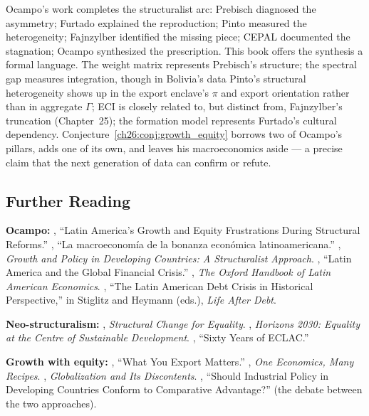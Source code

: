 \documentclass[../structural_economics_book.tex]{subfiles}
\begin{document}
Ocampo's work completes the structuralist arc: Prebisch diagnosed the asymmetry; Furtado explained the reproduction; Pinto measured the heterogeneity; Fajnzylber identified the missing piece; CEPAL documented the stagnation; Ocampo synthesized the prescription. This book offers the synthesis a formal language. The weight matrix represents Prebisch's structure; the spectral gap measures integration, though in Bolivia's data Pinto's structural heterogeneity shows up in the export enclave's $\pi$ and export orientation rather than in aggregate $\Gamma$; ECI is closely related to, but distinct from, Fajnzylber's truncation (Chapter~25); the formation model represents Furtado's cultural dependency. Conjecture~\ref{ch26:conj:growth_equity} borrows two of Ocampo's pillars, adds one of its own, and leaves his macroeconomics aside --- a precise claim that the next generation of data can confirm or refute.


\subsection*{Further Reading}

\textbf{Ocampo:} \citet{ocampo2004latin}, ``Latin America's Growth and Equity Frustrations During Structural Reforms.'' \citet{ocampo2007macroeconomia}, ``La macroeconom\'{i}a de la bonanza econ\'{o}mica latinoamericana.'' \citet{ocampo2009growth}, \textit{Growth and Policy in Developing Countries: A Structuralist Approach}. \citet{ocampo2009latin}, ``Latin America and the Global Financial Crisis.'' \citet{ocampo2011oxford}, \textit{The Oxford Handbook of Latin American Economics}. \citet{ocampo2014latin}, ``The Latin American Debt Crisis in Historical Perspective,'' in Stiglitz and Heymann (eds.), \textit{Life After Debt}.

\textbf{Neo-structuralism:} \citet{cepal2012structural}, \textit{Structural Change for Equality}. \citet{cepal2016horizons}, \textit{Horizons 2030: Equality at the Centre of Sustainable Development}. \citet{bielschowsky2009sixty}, ``Sixty Years of ECLAC.''

\textbf{Growth with equity:} \citet{hausmann2007what}, ``What You Export Matters.'' \citet{rodrik2007one}, \textit{One Economics, Many Recipes}. \citet{stiglitz2002globalization}, \textit{Globalization and Its Discontents}. \citet{lin2009should}, ``Should Industrial Policy in Developing Countries Conform to Comparative Advantage?'' (the debate between the two approaches).
\end{document}
